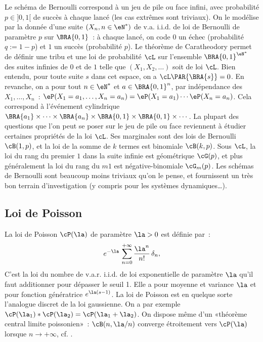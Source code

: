 %
\begin{rem}\label{ss:loi:schema-bernoulli}
  Le schéma de Bernoulli correspond à un jeu de pile ou face infini, avec
  probabilité $p\in]0,1[$ de succès à chaque lancé (les cas extrêmes sont
  triviaux). On le modélise par la donnée d'une suite $(X_n,n\in\eN^*)$ de v.a.
  i.i.d. de loi de Bernoulli de paramètre $p$ sur $\BRA{0,1}$~: à chaque
  lancé, on code $0$ un échec (probabilité $q:=1-p$) et $1$ un succès
  (probabilité $p$).  Le théorème de Caratheodory permet de définir une tribu
  et une loi de probabilité $\cL$ sur l'ensemble $\BRA{0,1}^{\eN^*}$ des
  suites infinies de $0$ et de $1$ telle que $(X_1,X_2,\ldots)$ soit de loi 
  $\cL$.
  Bien entendu, pour toute suite $s$ dans cet espace, on a
  $\cL\PAR{\BRA{s}}=0$. En revanche, on a pour tout $n\in\eN^*$ et
  $a\in\BRA{0,1}^n$, par indépendance des $X_1,\ldots,X_n$~:
  $\eP(X_1=a_1,\ldots,X_n=a_n)=\eP(X_1=a_1)\cdots\eP(X_n=a_n)$. 
  Cela correspond à l'événement cylindrique 
  $\BRA{a_1}\times\cdots\times\BRA{a_n}\times\BRA{0,1}\times\BRA{0,1}\times\cdots$. La plupart des questions
  que l'on peut se poser sur le jeu de pile ou face reviennent à étudier
  certaines propriétés de la loi $\cL$. Ses marginales sont des lois de 
  Bernoulli $\cB(1,p)$, et la loi de la somme de $k$ termes est binomiale
  $\cB(k,p)$. Sous $\cL$, la loi du rang du premier $1$ dans la
  suite infinie est géométrique $\cG(p)$, et plus généralement la loi du rang
  du $m$\Ieme $1$ est négative-binomiale $\cG_m(p)$.
  Les schémas de Bernoulli sont beaucoup moins triviaux qu'on le pense, et
  fournissent un très bon terrain d'investigation (y compris pour les
  systèmes dynamiques\ldots). 
  
\end{rem}

%
\subsection{Loi de Poisson}\label{ss:loi:poisson}
%

La loi de Poisson $\cP(\la)$ de paramètre $\la>0$ est définie par~:
$$
e^{-\la}\,\sum_{n=0}^{+\infty}\frac{\la^n}{n!}\,\delta_n,
$$
C'est la loi du nombre de v.a.r. i.i.d. de loi exponentielle de paramètre
$\la$ qu'il faut additionner pour dépasser le seuil 1. Elle a pour moyenne et
variance $\la$ et pour fonction génératrice $e^{\la(s-1)}$.
La loi de Poisson est en quelque sorte l'analogue discret de la loi gaussienne.
On a par exemple $\cP(\la_1)*\cP(\la_2)=\cP(\la_1+\la_2)$. On dispose même
d'un «théorème central limite poissonien»~: 
$\cB(n,\la/n)$ converge étroitement vers $\cP(\la)$ lorsque $n\to+\infty$,
cf. \cite[th. V.5.6 p. 148]{barbe-ledoux}.

